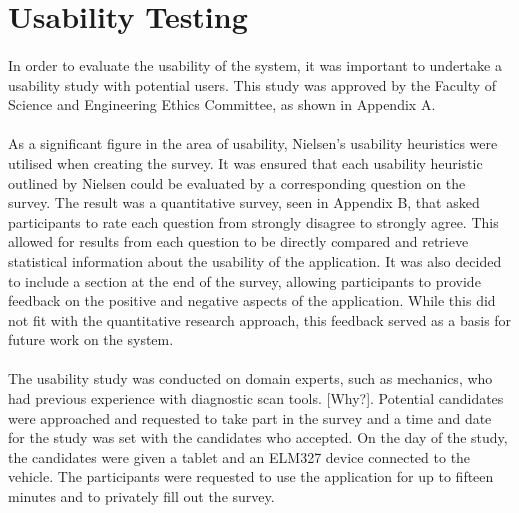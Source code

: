 \section{Usability Testing}{
	\paragraph{}{
	In order to evaluate the usability of the system, it was important to undertake a usability study with potential users. This study was approved by the Faculty of Science and Engineering Ethics Committee, as shown in Appendix A.
	}
	
	\paragraph{}{
	As a significant figure in the area of usability, Nielsen's usability heuristics \cite{Heuristics} were utilised when creating the survey. It was ensured that each usability heuristic outlined by Nielsen could be evaluated by a corresponding question on the survey. The result was a quantitative survey, seen in Appendix B, that asked participants to rate each question from strongly disagree to strongly agree. This allowed for results from each question to be directly compared and retrieve statistical information about the usability of the application. It was also decided to include a section at the end of the survey, allowing participants to provide feedback on the positive and negative aspects of the application. While this did not fit with the quantitative research approach, this feedback served as a basis for future work on the system.
	}
	
	\paragraph{}{
	The usability study was conducted on domain experts, such as mechanics, who had previous experience with diagnostic scan tools. [Why?]. Potential candidates were approached and requested to take part in the survey and a time and date for the study was set with the candidates who accepted. On the day of the study, the candidates were given a tablet and an ELM327 device connected to the vehicle. The participants were requested to use the application for up to fifteen minutes and to privately fill out the survey.
	}
	
}
